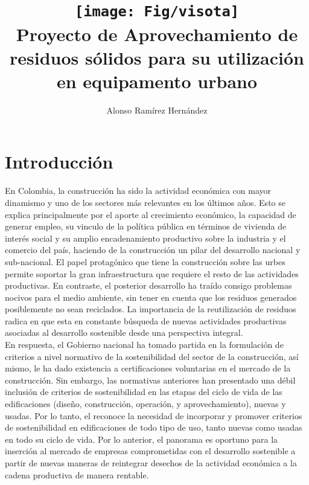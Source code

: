 \documentclass[12pt]{article}
\begin{document}
\title{
\vspace{-30mm}
\texttt{[image: Fig/visota]}\\[0.5cm]Proyecto de Aprovechamiento de residuos sólidos para su utilización en equipamento urbano}
\author{Alonso Ramírez Hernández}
\maketitle
\section{Introducción}
En Colombia, la construcción ha sido la actividad económica con mayor dinamismo y uno de los sectores más relevantes en los últimos años.  Esto se explica principalmente por el aporte al crecimiento económico, la capacidad de generar empleo, su vinculo de la política pública en términos de vivienda de interés social y su amplio encadenamiento productivo sobre la industria y el comercio del país, haciendo de la construcción un pilar del desarrollo nacional y sub-nacional. El papel protagónico que tiene la construcción sobre las urbes permite soportar la gran infraestructura que requiere el resto de las actividades productivas. En contraste, el posterior desarrollo ha traído consigo problemas nocivos para el medio ambiente, sin tener en cuenta que los residuos generados posiblemente no sean reciclados. La importancia de la reutilización de residuos radica en que esta en constante  búsqueda de nuevas actividades productivas asociadas al desarrollo sostenible desde una perspectiva integral.  \\

En respuesta, el Gobierno nacional ha tomado partida en la formulación de criterios a nivel normativo de la sostenibilidad del sector de la construcción, así mismo, le ha dado existencia a certificaciones voluntarias en el mercado de la construcción. Sin embargo, las normativas anteriores han presentado una débil inclusión de criterios de sostenibilidad en las etapas del ciclo de vida de las edificaciones (diseño, construcción, operación, y aprovechamiento), nuevas y usadas. Por lo tanto, el \cite{conpes2018} reconoce la necesidad de incorporar y promover criterios de sostenibilidad en edificaciones de todo tipo de uso, tanto nuevas como usadas en todo su ciclo de vida. Por lo anterior, el panorama es oportuno para la inserción al mercado de empresas comprometidas con el desarrollo sostenible a partir de nuevas maneras de reintegrar desechos de la actividad económica a la cadena productiva de manera rentable.
\end{document}
